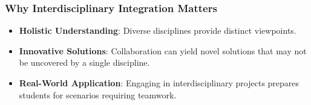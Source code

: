 \documentclass{beamer}
\begin{document}
\begin{frame}[fragile]
    \frametitle{Why Interdisciplinary Integration Matters}
    
    \begin{itemize}
        \item \textbf{Holistic Understanding}: Diverse disciplines provide distinct viewpoints.
        \item \textbf{Innovative Solutions}: Collaboration can yield novel solutions that may not be uncovered by a single discipline.
        \item \textbf{Real-World Application}: Engaging in interdisciplinary projects prepares students for scenarios requiring teamwork.
    \end{itemize}
\end{frame}
\end{document}
